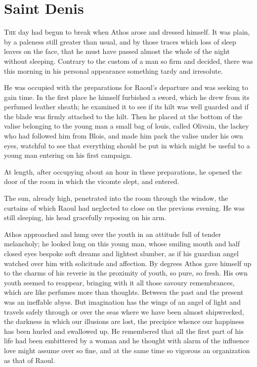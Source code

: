 \chapter{Saint Denis}

 \lettrine{T}{he} day had begun to break when Athos arose and dressed himself. It was plain, by a paleness still greater than usual, and by those traces which loss of sleep leaves on the face, that he must have passed almost the whole of the night without sleeping. Contrary to the custom of a man so firm and decided, there was this morning in his personal appearance something tardy and irresolute.

He was occupied with the preparations for Raoul's departure and was seeking to gain time. In the first place he himself furbished a sword, which he drew from its perfumed leather sheath; he examined it to see if its hilt was well guarded and if the blade was firmly attached to the hilt. Then he placed at the bottom of the valise belonging to the young man a small bag of louis, called Olivain, the lackey who had followed him from Blois, and made him pack the valise under his own eyes, watchful to see that everything should be put in which might be useful to a young man entering on his first campaign.

At length, after occupying about an hour in these preparations, he opened the door of the room in which the vicomte slept, and entered.

The sun, already high, penetrated into the room through the window, the curtains of which Raoul had neglected to close on the previous evening. He was still sleeping, his head gracefully reposing on his arm.

Athos approached and hung over the youth in an attitude full of tender melancholy; he looked long on this young man, whose smiling mouth and half closed eyes bespoke soft dreams and lightest slumber, as if his guardian angel watched over him with solicitude and affection. By degrees Athos gave himself up to the charms of his reverie in the proximity of youth, so pure, so fresh. His own youth seemed to reappear, bringing with it all those savoury remembrances, which are like perfumes more than thoughts. Between the past and the present was an ineffable abyss. But imagination has the wings of an angel of light and travels safely through or over the seas where we have been almost shipwrecked, the darkness in which our illusions are lost, the precipice whence our happiness has been hurled and swallowed up. He remembered that all the first part of his life had been embittered by a woman and he thought with alarm of the influence love might assume over so fine, and at the same time so vigorous an organization as that of Raoul.

